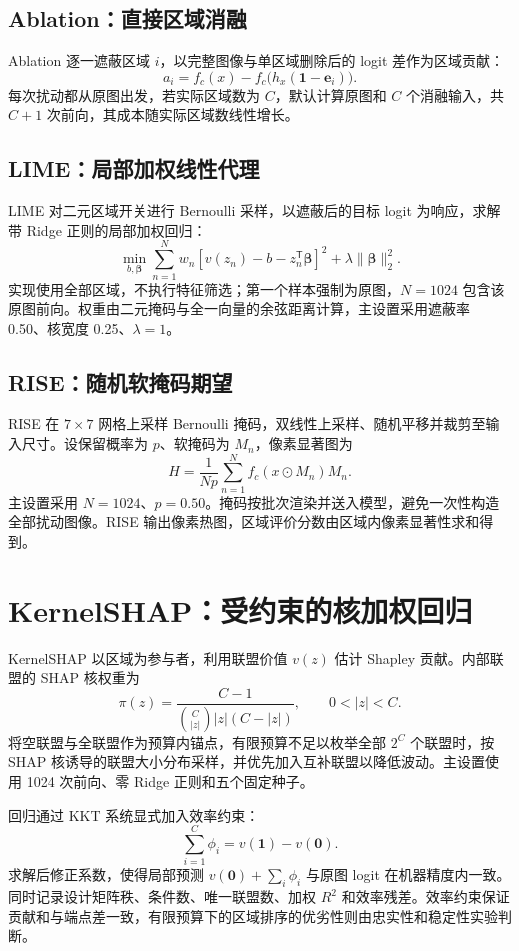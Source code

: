 \subsection{Ablation：直接区域消融}

Ablation 逐一遮蔽区域 $i$，以完整图像与单区域删除后的 logit 差作为区域贡献：
\[
    a_i=f_c(x)-f_c\bigl(h_x(\bm{1}-\bm{e}_i)\bigr).
\]
每次扰动都从原图出发，若实际区域数为 $C$，默认计算原图和 $C$ 个消融输入，共 $C+1$ 次前向，其成本随实际区域数线性增长。

\subsection{LIME：局部加权线性代理}

LIME\cite{ribeiro2016lime} 对二元区域开关进行 Bernoulli 采样，以遮蔽后的目标 logit 为响应，求解带 Ridge 正则的局部加权回归：
\[
    \min_{b,\bm{\beta}}
    \sum_{n=1}^{N} w_n\left[v(z_n)-b-z_n^{\mathsf T}\bm{\beta}\right]^2
    +\lambda\lVert\bm{\beta}\rVert_2^2.
\]
实现使用全部区域，不执行特征筛选；第一个样本强制为原图，$N=1024$ 包含该原图前向。权重由二元掩码与全一向量的余弦距离计算，主设置采用遮蔽率 0.50、核宽度 0.25、$\lambda=1$。

\subsection{RISE：随机软掩码期望}

RISE\cite{petsiuk2018rise} 在 $7\times7$ 网格上采样 Bernoulli 掩码，双线性上采样、随机平移并裁剪至输入尺寸。设保留概率为 $p$、软掩码为 $M_n$，像素显著图为
\[
    H=\frac{1}{Np}\sum_{n=1}^{N}f_c(x\odot M_n)M_n.
\]
主设置采用 $N=1024$、$p=0.50$。掩码按批次渲染并送入模型，避免一次性构造全部扰动图像。RISE 输出像素热图，区域评价分数由区域内像素显著性求和得到。

\section{KernelSHAP：受约束的核加权回归}

KernelSHAP\cite{lundberg2017shap} 以区域为参与者，利用联盟价值 $v(z)$ 估计 Shapley 贡献。内部联盟的 SHAP 核权重为
\[
    \pi(z)=\frac{C-1}{\binom{C}{|z|}|z|(C-|z|)},
    \qquad 0<|z|<C.
\]
将空联盟与全联盟作为预算内锚点，有限预算不足以枚举全部 $2^C$ 个联盟时，按 SHAP 核诱导的联盟大小分布采样，并优先加入互补联盟以降低波动。主设置使用 1024 次前向、零 Ridge 正则和五个固定种子。

回归通过 KKT 系统显式加入效率约束：
\[
    \sum_{i=1}^{C}\phi_i=v(\bm{1})-v(\bm{0}).
\]
求解后修正系数，使得局部预测 $v(\bm{0})+\sum_i\phi_i$ 与原图 logit 在机器精度内一致。同时记录设计矩阵秩、条件数、唯一联盟数、加权 $R^2$ 和效率残差。效率约束保证贡献和与端点差一致，有限预算下的区域排序的优劣性则由忠实性和稳定性实验判断。


